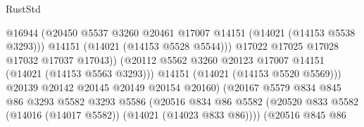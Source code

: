 \begin{lexlean}{RustStd}
\begin{coremodule}
                                              @16944
                                              (@20450
                                                @5537
                                                @3260
                                                @20461
                                                @17007
                                                @14151
                                                (@14021 (@14153 @5538 @3293)))
                                              @14151
                                              (@14021 (@14153 @5528 @5544)))
                                            @17022
                                            @17025
                                            @17028
                                            @17032
                                            @17037
                                            @17043))
                                        (@20112
                                          @5562
                                          @3260
                                          @20123
                                          @17007
                                          @14151
                                          (@14021 (@14153 @5563 @3293)))
                                        @14151
                                        (@14021 (@14153 @5520 @5569)))
                                      @20139
                                      @20142
                                      @20145
                                      @20149
                                      @20154
                                      @20160)
                                    (@20167
                                      @5579
                                      @834
                                      @845
                                      @86
                                      @3293
                                      @5582
                                      @3293
                                      @5586
                                      (@20516
                                        @834
                                        @86
                                        @5582
                                        (@20520
                                          @833
                                          @5582
                                          (@14016 (@14017 @5582))
                                          (@14021 (@14023 @833 @86))))
                                      (@20516
                                        @845
                                        @86

\end{coremodule}
\end{lexlean}
